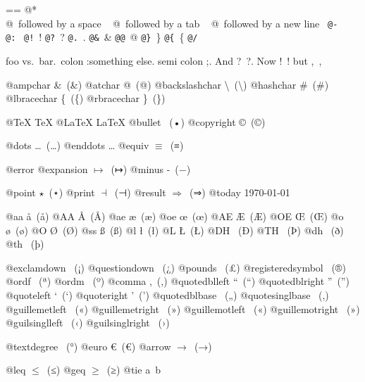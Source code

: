 \documentclass{book}
\makeatletter
\newenvironment{Texinfopreformatted}{%
  \par\GNUTobeylines\obeyspaces\frenchspacing\parskip=\z@\parindent=\z@}{}
{\catcode`\^^M=13 \gdef\GNUTobeylines{\catcode`\^^M=13 \def^^M{\null\par}}}
\newenvironment{Texinfoindented}{\begin{list}{}{}\item\relax}{\end{list}}
\renewcommand{\_}{\Texinfounderscore\discretionary{}{}{}}
\makeatother
\begin{document}
{{\begin{Texinfoindented}
\begin{Texinfopreformatted}
@* \leavevmode{}\\
@\ followed by a space
\ {}
@\ followed by a tab
\ {}
@\ followed by a new line
\ {}\texttt{@-}\ \-{}
\texttt{@:}\ \@
\texttt{@!}\ \@!
\texttt{@?}\ \@?
\texttt{@.}\ \@.
\texttt{@\&}\ \&
\texttt{@@}\ @
\texttt{@\}}\ \}
\texttt{@\{}\ \{
\texttt{@/}\ 

foo vs.\@\ bar.\ 
colon :\@And something else.
semi colon ;\@.
And ?\ ?\@.
Now !\ !\@@
but ,\ ,\@

@ampchar \&\ (\&)
@atchar @\ (@)
@backslashchar \textbackslash{}\ (\textbackslash{})
@hashchar \#\ (\#)
@lbracechar \{\ (\{)
@rbracechar \}\ (\})

@TeX \TeX{}
@LaTeX \LaTeX{}
@bullet \textbullet{}\ (•)
@copyright \copyright{}\ (©)

@dots \dots{}\@\ (…)
@enddots \dots{}
@equiv $\equiv{}$\ (≡)

@error 
@expansion $\mapsto{}$\ (↦)
@minus -\ (−)

@point $\star{}$\ (⋆)
@print $\dashv{}$\ (⊣)
@result $\Rightarrow{}$\ (⇒)
@today \today{}

@aa \aa{}\ (å)
@AA \AA{}\ (Å)
@ae \ae{}\ (æ)
@oe \oe{}\ (œ)
@AE \AE{}\ (Æ)
@OE \OE{}\ (Œ)
@o \o{}\ (ø)
@O \O{}\ (Ø)
@ss \ss{}\ (ß)
@l \l{}\ (ł)
@L \L{}\ (Ł)
@DH \DH{}\ (Ð)
@TH \TH{}\ (Þ)
@dh \dh{}\ (ð)
@th \th{}\ (þ)

@exclamdown \textexclamdown{}\ (¡)
@questiondown \textquestiondown{}\ (¿)
@pounds \textsterling{}\ (£)
@registeredsymbol \circledR{}\ (®)
@ordf \textordfeminine{}\ (ª)
@ordm \textordmasculine{}\ (º)
@comma ,\ (,)
@quotedblleft \textquotedblleft{}\ (“)
@quotedblright \textquotedblright{}\ (”)
@quoteleft \textquoteleft{}\ (‘)
@quoteright \textquoteright{}\ (’)
@quotedblbase \quotedblbase{}\ („)
@quotesinglbase \quotesinglbase{}\ (‚)
@guillemetleft \guillemotleft{}\ («)
@guillemetright \guillemotright{}\ (»)
@guillemotleft \guillemotleft{}\ («)
@guillemotright \guillemotright{}\ (»)
@guilsinglleft \guilsinglleft{}\ (‹)
@guilsinglright \guilsinglright{}\ (›)

@textdegree \textdegree{}\ (°)
@euro \euro{}\ (€)
@arrow $\rightarrow{}$\ (→)

@leq $\leq{}$\ (≤)
@geq $\geq{}$\ (≥)
@tie a~b


\end{Texinfopreformatted}
\end{Texinfoindented}}}
\end{document}
